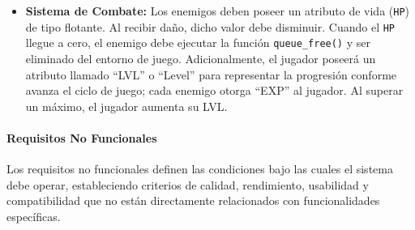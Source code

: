 \documentclass[journal,article,accept,pdftex,moreauthors]{Definitions/mdpi}
\begin{document}
\begin{itemize}
  \item \textbf{Sistema de Combate:} Los enemigos deben poseer un atributo de vida (\texttt{HP}) de tipo flotante. Al recibir daño, dicho valor debe disminuir. Cuando el \texttt{HP} llegue a cero, el enemigo debe ejecutar la función \texttt{queue\_free()} y ser eliminado del entorno de juego. Adicionalmente, el jugador poseerá un atributo llamado ``LVL'' o ``Level'' para representar la progresión conforme avanza el ciclo de juego; cada enemigo otorga ``EXP'' al jugador. Al superar un máximo, el jugador aumenta su LVL.

\end{itemize}

\paragraph{Requisitos No Funcionales}

Los requisitos no funcionales definen las condiciones bajo las cuales el sistema debe operar, estableciendo criterios de calidad, rendimiento, usabilidad y compatibilidad que no están directamente relacionados con funcionalidades específicas.
\end{document}
